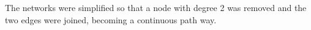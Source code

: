 \documentclass[11pt]{article} %
\begin{document}
The networks were simplified so that a node with degree 2 was removed and the two edges were joined, becoming a continuous path way. 

%
%	
%	
%	
%
%			
%			
%	
%	
%		
%		
%		
%		
%
%		
%
%
%
%
%		
%		
%	
%	
\end{document}
